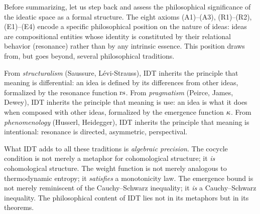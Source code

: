 \begin{interpretation}\label{interp:ch1:philosophical_achievement}
Before summarizing, let us step back and assess the philosophical
significance of the ideatic space as a formal structure. The eight axioms
(A1)--(A3), (R1)--(R2), (E1)--(E4) encode a specific philosophical
position on the nature of ideas: ideas are compositional entities whose
identity is constituted by their relational behavior (resonance) rather
than by any intrinsic essence. This position draws from, but goes beyond,
several philosophical traditions.

From \emph{structuralism} (Saussure, L\'evi-Strauss), IDT inherits the
principle that meaning is differential: an idea is defined by its
differences from other ideas, formalized by the resonance function $\mathrm{rs}$.
From \emph{pragmatism} (Peirce, James, Dewey), IDT inherits the principle
that meaning is use: an idea is what it does when composed with other ideas,
formalized by the emergence function $\kappa$. From \emph{phenomenology}
(Husserl, Heidegger), IDT inherits the principle that meaning is
intentional: resonance is directed, asymmetric, perspectival.

What IDT adds to all these traditions is \emph{algebraic precision}. The
cocycle condition is not merely a metaphor for cohomological structure; it
\emph{is} cohomological structure. The weight function is not merely
analogous to thermodynamic entropy; it \emph{satisfies} a monotonicity
law. The emergence bound is not merely reminiscent of the Cauchy--Schwarz
inequality; it \emph{is} a Cauchy--Schwarz inequality. The philosophical
content of IDT lies not in its metaphors but in its theorems.
\end{interpretation}

